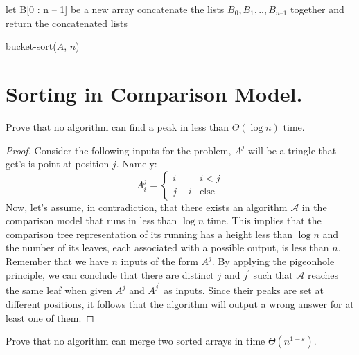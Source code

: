   \begin{algorithm}
    	let B[0 : n – 1] be a new array
	\For{ $i \leftarrow [1, n]$}{
	    insert $A_{i}$ into list $B_{ \lfloor n A_{i} \rfloor} ]$
       	}
	concatenate the lists $B_{0}, B_{1}, .. , B_{n – 1}$ together and\\
	return the concatenated lists
\caption{bucket-sort($A$, $n$)}
  \end{algorithm}

%

\section{Sorting in Comparison Model.}

\begin{example}
  Prove that no algorithm can find a peak in less than $\Theta\left( \log n \right)$ time.
\end{example}
\begin{proof}
  Consider the following inputs for the problem, $A^{j}$ will be a tringle that get's is point at position $j$. Namely:  
  \begin{equation*}
      A^{j}_{i} = \begin{cases}
        i & i < j \\
        j - i & \text{else}
      \end{cases}
  \end{equation*} 
  Now, let's assume, in contradiction, that there exists an algorithm $\mathcal{A}$ in the comparison model that runs in less than $\log n$ time. This implies that the comparison tree representation of its running has a height less than $\log n$ and the number of its leaves, each associated with a possible output, is less than $n$. Remember that we have $n$ inputs of the form $A^{j}$. By applying the pigeonhole principle, we can conclude that there are distinct $j$ and $j^{\prime}$ such that $\mathcal{A}$ reaches the same leaf when given $A^{j}$ and $A^{j^{\prime}}$ as inputs. Since their peaks are set at different positions, it follows that the algorithm will output a wrong answer for at least one of them.
\end{proof}

\begin{example}
Prove that no algorithm can merge two sorted arrays in time $\Theta(n^{1-\varepsilon})$.
\end{example}



